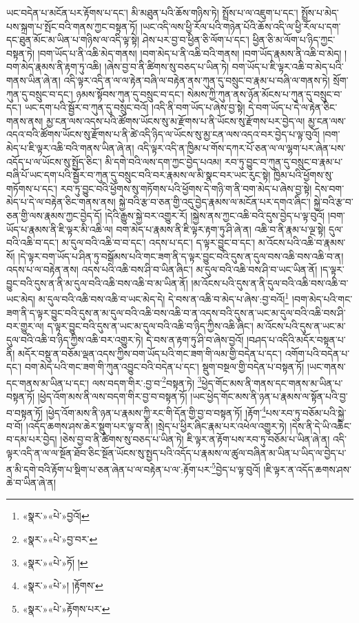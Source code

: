 ཡང་བདེན་པ་མངོན་པར་རྟོགས་པ་དང་། མི་མཐུན་པའི་ཆོས་གཉིས་ཏེ། སྤྲོས་པ་ལ་འཇུག་པ་དང་། སྤྲོས་པ་མེད་པས་སྐྲག་པ་སྤོང་བའི་གནས་ཀྱང་བསྟན་ཏོ། །ཡང་འདི་ལས་ཕྱི་རོལ་པའི་གཉེན་པོའི་ཆོས་འདི་ལ་ཕྱི་རོལ་པ་དག་དང་ཐུན་མོང་མ་ཡིན་པ་གཉིས་ལ་འདི་ལྟ་སྟེ། ཤེས་པར་བྱ་བ་ཕྱིན་ཅི་ལོག་པ་དང་། ཕྱིན་ཅི་མ་ལོག་པ་ཉིད་ཀྱང་བསྟན་ཏེ། །བག་ཡོད་པ་ནི་འཆི་མེད་གནས། །བག་མེད་པ་ནི་འཆི་བའི་གནས། །བག་ཡོད་རྣམས་ནི་འཆི་བ་མེད། །བག་མེད་རྣམས་ནི་རྟག་ཏུ་འཆི། །ཞེས་བྱ་བ་ནི་ཚིགས་སུ་བཅད་པ་ཡིན་ཏེ། བག་ཡོད་པ་ཇི་ལྟར་འཆི་བ་མེད་པའི་གནས་ཡིན་ཞེ་ན། འདི་ལྟར་འདི་ན་ལ་ལ་རྟེན་བཞི་ལ་བརྟེན་ནས་ཀུན་དུ་བསྲུང་བ་རྣམ་པ་བཞི་ལ་གནས་ཏེ། སྲོག་ཀུན་དུ་བསྲུང་བ་དང་། ཉམས་སྟོབས་ཀུན་དུ་བསྲུང་བ་དང་། སེམས་ཀྱི་ཀུན་ནས་ཉོན་མོངས་པ་ཀུན་དུ་བསྲུང་བ་དང་། ཡང་དག་པའི་སྦྱོར་བ་ཀུན་དུ་བསྲུང་བའོ། །འདི་ནི་བག་ཡོད་པ་ཞེས་བྱ་སྟེ། དེ་བག་ཡོད་པ་དེ་ལ་རྟེན་ཅིང་གནས་ནས། མྱ་ངན་ལས་འདས་པའི་ཚོགས་ཡོངས་སུ་མ་རྫོགས་པ་ནི་ཡོངས་སུ་རྫོགས་པར་བྱེད་ལ། མྱ་ངན་ལས་འདའ་བའི་ཚོགས་ཡོངས་སུ་རྫོགས་པ་ནི་ཚེ་འདི་ཉིད་ལ་ཡོངས་སུ་མྱ་ངན་ལས་འདའ་བར་བྱེད་པ་ལྟ་བུའོ། །བག་མེད་པ་ཇི་ལྟར་འཆི་བའི་གནས་ཡིན་ཞེ་ན། འདི་ལྟར་འདི་ན་ཁྱིམ་པ་གོས་དཀར་པོ་ཅན་ལ་ལ་ལྷག་པར་ཞེན་པས་འདོད་པ་ལ་ཡོངས་སུ་སྤྱོད་ཅིང་། མི་དགེ་བའི་ལས་དག་ཀྱང་བྱེད་པའམ། རབ་ཏུ་བྱུང་བ་ཀུན་དུ་བསྲུང་བ་རྣམ་པ་བཞི་པོ་ཡང་དག་པའི་སྦྱོར་བ་ཀུན་དུ་བསྲུང་བའི་བར་རྣམས་ལ་མི་སྣང་བར་ཡང་རུང་སྟེ། ཁྱིམ་པའི་ཕྱོགས་སུ་གཏོགས་པ་དང་། རབ་ཏུ་བྱུང་བའི་ཕྱོགས་སུ་གཏོགས་པའི་ཕྱོགས་དེ་གཉི་ག་ནི་བག་མེད་པ་ཞེས་བྱ་སྟེ། དེས་བག་མེད་པ་དེ་ལ་བརྟེན་ཅིང་གནས་ནས། སྐྱེ་བའི་རྩ་བ་ཅན་གྱི་འདུ་བྱེད་རྣམས་ལ་མངོན་པར་དགའ་ཞིང་། སྐྱེ་བའི་རྩ་བ་ཅན་གྱི་ལས་རྣམས་ཀྱང་བྱེད་དོ། །དེའི་རྒྱུས་སྐྱེ་བར་འགྱུར་རོ། །སྐྱེས་ནས་ཀྱང་འཆི་བའི་དུས་བྱེད་པ་ལྟ་བུའོ། །བག་ཡོད་པ་རྣམས་ནི་ཇི་ལྟར་མི་འཆི་ལ། བག་མེད་པ་རྣམས་ནི་ཇི་ལྟར་རྟག་ཏུ་ཤི་ཞེ་ན། འཆི་བ་ནི་རྣམ་པ་ལྔ་སྟེ། དུལ་བའི་འཆི་བ་དང་། མ་དུལ་བའི་འཆི་བ་བ་དང་། འདས་པ་དང་། ད་ལྟར་བྱུང་བ་དང་། མ་འོངས་པའི་འཆི་བ་རྣམས་སོ། །དེ་ལྟར་བག་ཡོད་པ་ཤིན་ཏུ་བསྒོམས་པའི་གང་ཟག་ནི་ད་ལྟར་བྱུང་བའི་དུས་ན་དུལ་བས་འཆི་བས་འཆི་བ་ན། འདས་པ་ལ་བརྟེན་ནས། འདས་པའི་འཆི་བས་ཤི་བ་ཡིན་ཞིང་། མ་དུལ་བའི་འཆི་བས་ཤི་བ་ཡང་ཡིན་ནོ། །ད་ལྟར་བྱུང་བའི་དུས་ན་ནི་མ་དུལ་བའི་འཆི་བས་འཆི་བ་མ་ཡིན་ནོ། །མ་འོངས་པའི་དུས་ན་ནི་དུལ་བའི་འཆི་བས་འཆི་བ་ཡང་མེད། མ་དུལ་བའི་འཆི་བས་འཆི་བ་ཡང་མེད་དེ། དེ་བས་ན་འཆི་བ་མེད་པ་ཞེས་:བྱ་བའོ།\footnote{«སྣར་»«པེ་»བྱའོ།} །བག་མེད་པའི་གང་ཟག་ནི་ད་ལྟར་བྱུང་བའི་དུས་ན་མ་དུལ་བའི་འཆི་བས་འཆི་བ་ན་འདས་བའི་དུས་ན་ཡང་མ་དུལ་བའི་འཆི་བས་ཤི་བར་གྱུར་ལ། ད་ལྟར་བྱུང་བའི་དུས་ན་ཡང་མ་དུལ་བའི་འཆི་བ་ཉིད་ཀྱིས་འཆི་ཞིང་། མ་འོངས་པའི་དུས་ན་ཡང་མ་དུལ་བའི་འཆི་བ་ཉིད་ཀྱིས་འཆི་བར་འགྱུར་ཏེ། དེ་བས་ན་རྟག་ཏུ་ཤི་བ་ཞེས་བྱའོ། །བཤད་པ་འདིའི་མདོར་བསྟན་པ་ནི། མདོར་བསྡུ་ན་བཅོམ་ལྡན་འདས་ཀྱིས་བག་ཡོད་པའི་གང་ཟག་གི་ལམ་གྱི་བདེན་པ་དང་། འགོག་པའི་བདེན་པ་དང་། བག་མེད་པའི་གང་ཟག་གི་ཀུན་འབྱུང་བའི་བདེན་པ་དང་། སྡུག་བསྔལ་གྱི་བདེན་པ་བསྟན་ཏོ། །ཡང་གནས་དང་གནས་མ་ཡིན་པ་དང་། ལས་བདག་གིར་:བྱ་བ་\footnote{«སྣར་»«པེ་»བྱ་བར་}བསྟན་ཏེ། \footnote{«སྣར་»«པེ་»ཏོ། ། }ཕྱེད་གོང་མས་ནི་གནས་དང་གནས་མ་ཡིན་པ་བསྟན་ཏོ། །ཕྱེད་འོག་མས་ནི་ལས་བདག་གིར་བྱ་བ་བསྟན་ཏོ། །ཡང་ཕྱེད་གོང་མས་ནི་ཉན་པ་རྣམས་ལ་སྟོན་པའི་བྱ་བ་བསྟན་ཏོ། །ཕྱེད་འོག་མས་ནི་ཉན་པ་རྣམས་ཀྱི་རང་གི་དོན་གྱི་བྱ་བ་བསྟན་ཏོ། །རྟོག་\footnote{«སྣར་»«པེ་»། །རྟོགས་}པས་རབ་ཏུ་བཅོམ་པའི་སྐྱེ་བ་བོ། །འདོད་ཆགས་ཤས་ཆེར་སྡུག་པར་ལྟ་བ་ནི། །སྲེད་པ་ཕྱིར་ཞིང་རྣམ་པར་འཕེལ་འགྱུར་ཏེ། །དེས་ནི་དེ་ཡི་འཆིང་བ་དམ་པར་བྱེད། །ཅེས་བྱ་བ་ནི་ཚིགས་སུ་བཅད་པ་ཡིན་ཏེ། ཇི་ལྟར་ན་རྟོག་པས་རབ་ཏུ་བཅོམ་པ་ཡིན་ཞེ་ན། འདི་ལྟར་འདི་ན་ལ་ལ་སྔོན་ཐོབ་ཅིང་སྔོན་ཡོངས་སུ་སྤྱད་པའི་འདོད་པ་རྣམས་ལ་ཚུལ་བཞིན་མ་ཡིན་པ་ཡིད་ལ་བྱེད་པ་ན་མི་དགེ་བའི་རྟོག་པ་སྡིག་པ་ཅན་ཞེན་པ་ལ་བརྟེན་པ་ལ་:རྟོག་པར་\footnote{«སྣར་»«པེ་»རྟོགས་པར་}བྱེད་པ་ལྟ་བུའོ། །ཇི་ལྟར་ན་འདོད་ཆགས་ཤས་ཆེ་བ་ཡིན་ཞེ་ན། 